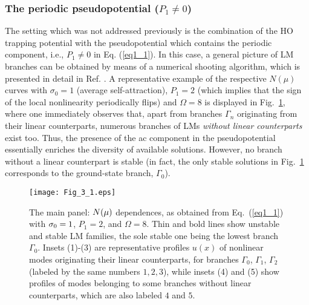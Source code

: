 \documentclass[aps,preprint,showkeys,
]{revtex4}
\begin{document}
\subsubsection{The periodic pseudopotential ($P_{1}\neq 0$)}

\label{P1_ne_0}

The setting which was not addressed previously is the combination of the HO
trapping potential with the pseudopotential which contains the periodic
component, i.e., $P_{1}\neq 0$ in Eq. (\ref{eq1_1}). In this case, a general
picture of LM branches can be obtained by means of a numerical shooting
algorithm, which is presented in detail in Ref. \cite{AZ07}.
A representative example of the respective $N(\mu )$ curves
with $\sigma _{0}=1$ (average self-attraction), $P_{1}=2$ (which implies
that the sign of the local nonlinearity periodically flips) and $\Omega =8$
is displayed in Fig.~\ref{FigP_1ne_0_1}, where one immediately observes
that, apart from branches $\Gamma _{n}$ originating from their linear
counterparts, numerous branches of LMs \emph{without linear counterparts}
exist too. Thus, the presence of the ac component in the pseudopotential
essentially enriches the diversity of available solutions. However, no
branch without a linear counterpart is stable (in fact, the only stable
solutions in Fig.~\ref{FigP_1ne_0_1} corresponds to the ground-state branch,
$\Gamma _{0}$).
\begin{figure}[tbp]
\texttt{[image: Fig\_3\_1.eps]}%
\caption{The main panel: $N(\protect\mu )$ dependences, as obtained from
Eq.~(\protect\ref{eq1_1}) with $\protect\sigma _{0}=1$, $P_{1}=2$, and $%
\Omega =8$. Thin and bold lines show unstable and stable LM families, the
sole stable one being the lowest branch $\Gamma _{0}$. Insets (1)-(3) are
representative profiles $u(x)$ of nonlinear modes originating their linear
counterparts, for branches $\Gamma _{0}$, $\Gamma _{1}$, $\Gamma _{2}$
(labeled by the same numbers $1,2,3$), while insets (4) and (5) show
profiles of modes belonging to some branches without linear counterparts,
which are also labeled $4$ and $5$. }
\label{FigP_1ne_0_1}
\end{figure}
\end{document}
